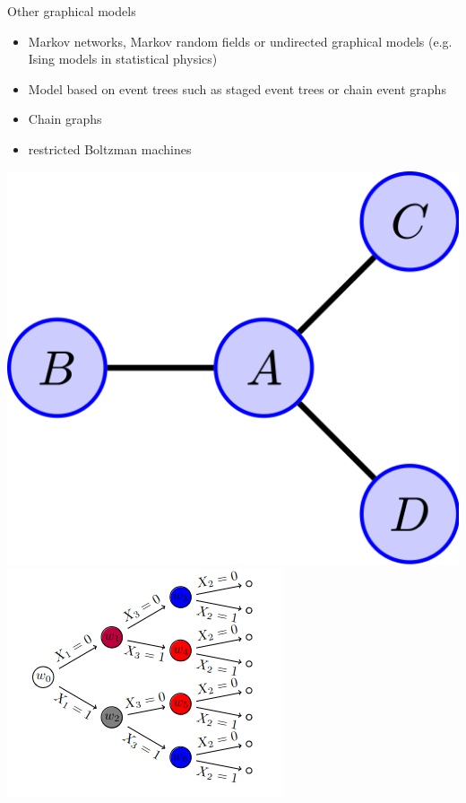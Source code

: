 \documentclass{beamer}
\begin{document}
\begin{frame}{Other graphical models}
	\begin{itemize}
		\item Markov networks, Markov random fields or undirected graphical models (e.g. Ising models in statistical physics) \citep{koller2009probabilistic, lauritzen1996graphical} 
		\item Model based on event trees such as staged event trees or chain event graphs
			\citep{leonelli23a}
		\item Chain graphs 
		\item restricted Boltzman machines 
	\end{itemize}
	\includegraphics[scale=0.08]{images/undirected}
	\includegraphics[scale=0.3]{images/tree}

\end{frame}
\end{document}
